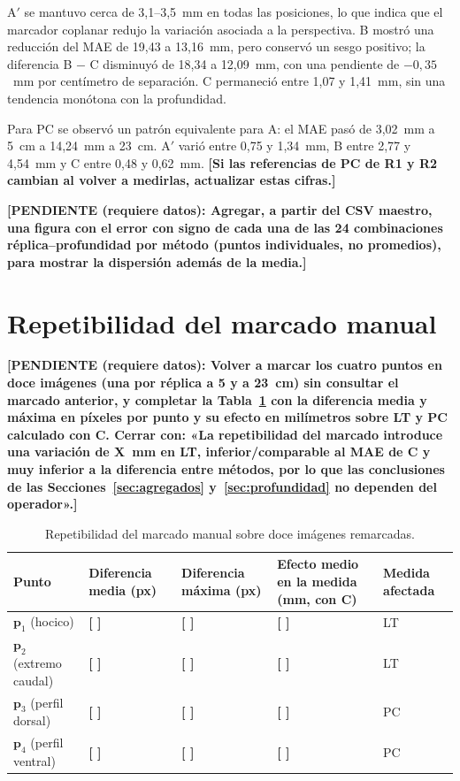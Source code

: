 \documentclass{report}
\newcommand{\Aprime}{A$'$}
\newcommand{\pendiente}[1]{\par\textbf{[PENDIENTE (requiere datos): #1]}\par}
\newcommand{\pend}[1]{\textbf{[#1]}}
\begin{document}
\Aprime{} se mantuvo cerca de 3,1--3,5~mm en todas las posiciones, lo que indica que el marcador coplanar redujo la variación asociada a la perspectiva. B mostró una reducción del MAE de 19,43 a 13,16~mm, pero conservó un sesgo positivo; la diferencia B $-$ C disminuyó de 18,34 a 12,09~mm, con una pendiente de $-0{,}35$~mm por centímetro de separación. C permaneció entre 1,07 y 1,41~mm, sin una tendencia monótona con la profundidad.

Para PC se observó un patrón equivalente para A: el MAE pasó de 3,02~mm a 5~cm a 14,24~mm a 23~cm. \Aprime{} varió entre 0,75 y 1,34~mm, B entre 2,77 y 4,54~mm y C entre 0,48 y 0,62~mm. \pend{Si las referencias de PC de R1 y R2 cambian al volver a medirlas, actualizar estas cifras.}

\pendiente{Agregar, a partir del CSV maestro, una figura con el error con signo de cada una de las 24 combinaciones réplica--profundidad por método (puntos individuales, no promedios), para mostrar la dispersión además de la media.}

\section{Repetibilidad del marcado manual}
\label{sec:repetibilidad}

\pendiente{Volver a marcar los cuatro puntos en doce imágenes (una por réplica a 5 y a 23~cm) sin consultar el marcado anterior, y completar la Tabla~\ref{tab:repetibilidad} con la diferencia media y máxima en píxeles por punto y su efecto en milímetros sobre LT y PC calculado con C. Cerrar con: «La repetibilidad del marcado introduce una variación de X~mm en LT, inferior/comparable al MAE de C y muy inferior a la diferencia entre métodos, por lo que las conclusiones de las Secciones~\ref{sec:agregados} y~\ref{sec:profundidad} no dependen del operador».}

\begin{table}[htbp]

\caption{Repetibilidad del marcado manual sobre doce imágenes remarcadas.}
\label{tab:repetibilidad}
\begin{tabular}{@{}p{3cm}p{2cm}p{2.2cm}p{3.2cm}p{1.6cm}@{}}
\hline
Punto & Diferencia media (px) & Diferencia máxima (px) & Efecto medio en la medida (mm, con C) & Medida afectada \\
\hline
$\mathbf{p}_1$ (hocico) & \pend{ } & \pend{ } & \pend{ } & LT \\
$\mathbf{p}_2$ (extremo caudal) & \pend{ } & \pend{ } & \pend{ } & LT \\
$\mathbf{p}_3$ (perfil dorsal) & \pend{ } & \pend{ } & \pend{ } & PC \\
$\mathbf{p}_4$ (perfil ventral) & \pend{ } & \pend{ } & \pend{ } & PC \\
\hline
\end{tabular}
\end{table}
\end{document}
